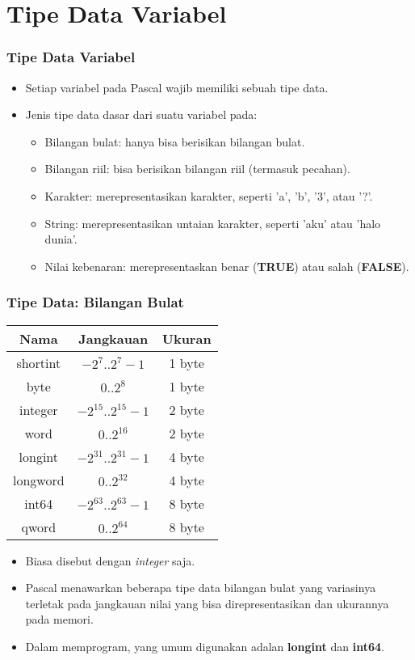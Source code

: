 \documentclass{beamer}
\begin{document}
\section{Tipe Data Variabel}
\frame{\sectionpage}

\begin{frame}
\frametitle{Tipe Data Variabel}
\begin{itemize}
	\item Setiap variabel pada Pascal wajib memiliki sebuah \alert{tipe data}.
	\item Jenis tipe data dasar dari suatu variabel pada:
	\begin{itemize}
		\item Bilangan bulat: hanya bisa berisikan bilangan bulat.
		\item Bilangan riil: bisa berisikan bilangan riil (termasuk pecahan).
		\item Karakter: merepresentasikan karakter, seperti 'a', 'b', '3', atau '?'.
		\item String: merepresentasikan untaian karakter, seperti 'aku' atau 'halo dunia'.
		\item Nilai kebenaran: merepresentaskan benar (\textbf{TRUE}) atau salah (\textbf{FALSE}).
	\end{itemize}
\end{itemize}
\end{frame}

\begin{frame}
\frametitle{Tipe Data: Bilangan Bulat}
\begin{table}[ht]
	\begin{tabular}{|c|c|c|}
		\hline Nama  & Jangkauan  & Ukuran \\ 
		\hline shortint & $-2^7 .. 2^7-1$ & 1 byte \\ 
		\hline byte & $0 .. 2^8$ & 1 byte\\ 
		\hline integer & $-2^{15} .. 2^{15}-1$ & 2 byte\\ 
		\hline word & $0 .. 2^{16}$ & 2 byte\\ 
		\hline longint & $-2^{31} .. 2^{31}-1$ & 4 byte\\ 
		\hline longword & $0 .. 2^{32}$ & 4 byte\\ 
		\hline int64 & $-2^{63} .. 2^{63}-1$ & 8 byte\\ 
		\hline qword & $0 .. 2^{64}$ & 8 byte\\ 
		\hline 
	\end{tabular}
\end{table} 
\begin{itemize}
	\item Biasa disebut dengan \alert{\textit{integer}} saja.
	\item Pascal menawarkan beberapa tipe data bilangan bulat yang variasinya terletak pada jangkauan nilai yang bisa direpresentasikan dan ukurannya pada memori.
	\item Dalam memprogram, yang umum digunakan adalan \alert{\textbf{longint}} dan \alert{\textbf{int64}}. 
\end{itemize}
\end{frame}
\end{document}
